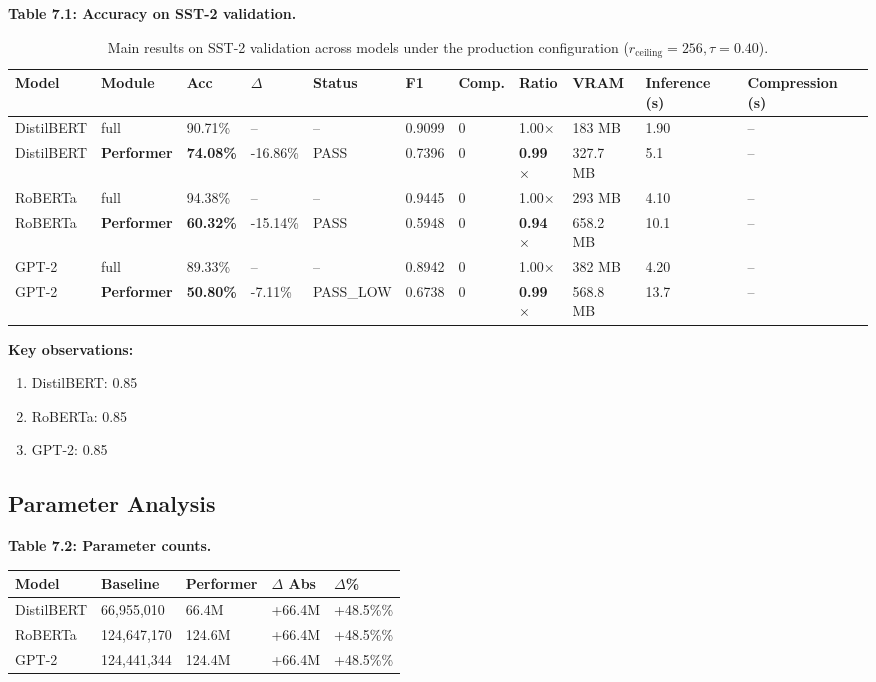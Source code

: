 \textbf{Table 7.1: Accuracy on SST-2 validation.}

\begin{table}[t]
\centering
\small
\begin{tabular}{lllllllllll}
\toprule
\textbf{Model} & \textbf{Module} & \textbf{Acc} & \textbf{$\Delta$} & \textbf{Status} & \textbf{F1} & \textbf{Comp.} & \textbf{Ratio} & \textbf{VRAM} & \textbf{Inference (s)} & \textbf{Compression (s)} \\
\midrule
DistilBERT & full & 90.71\% & -- & -- & 0.9099 & 0 & 1.00$\times$ & 183 MB & 1.90 & -- \\
DistilBERT & \textbf{Performer} & \textbf{74.08\%} & -16.86\% & PASS & 0.7396 & 0 & \textbf{0.99$\times$} & 327.7 MB & 5.1 & -- \\
RoBERTa & full & 94.38\% & -- & -- & 0.9445 & 0 & 1.00$\times$ & 293 MB & 4.10 & -- \\
RoBERTa & \textbf{Performer} & \textbf{60.32\%} & -15.14\% & PASS & 0.5948 & 0 & \textbf{0.94$\times$} & 658.2 MB & 10.1 & -- \\
GPT-2 & full & 89.33\% & -- & -- & 0.8942 & 0 & 1.00$\times$ & 382 MB & 4.20 & -- \\
GPT-2 & \textbf{Performer} & \textbf{50.80\%} & -7.11\% & PASS\_LOW & 0.6738 & 0 & \textbf{0.99$\times$} & 568.8 MB & 13.7 & -- \\
\bottomrule
\end{tabular}
\caption{Main results on SST-2 validation across models under the production configuration ($r_{\mathrm{ceiling}}=256, \tau=0.40$).}
\label{tab:main_sst2}
\end{table}

\textbf{Key observations:}

\begin{enumerate}
\item DistilBERT: 0.85
\item RoBERTa: 0.85
\item GPT-2: 0.85

\end{enumerate}
\subsection{Parameter Analysis}

\textbf{Table 7.2: Parameter counts.}

\begin{table}[H]
\centering
\small
\begin{tabular}{lllll}
\toprule
\textbf{Model} & \textbf{Baseline} & \textbf{Performer} & \textbf{$\Delta$ Abs} & \textbf{$\Delta$\%} \\
\midrule
DistilBERT & 66,955,010 & 66.4M & +66.4M & +48.5\%\% \\
RoBERTa & 124,647,170 & 124.6M & +66.4M & +48.5\%\% \\
GPT-2 & 124,441,344 & 124.4M & +66.4M & +48.5\%\% \\
\bottomrule
\end{tabular}
\end{table}

